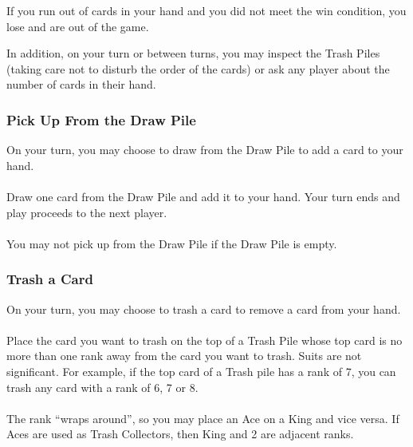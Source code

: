 \documentclass{article}
\begin{document}
If you run out of cards in your hand and you did not meet the win condition, you lose and are out of the game.

In addition, on your turn or between turns, you may inspect the Trash Piles (taking care not to disturb the order of the cards) or ask any player about the number of cards in their hand.

\subsubsection{Pick Up From the Draw Pile}
\label{sec:draw}

On your turn, you may choose to draw from the Draw Pile to add a card to your hand.

\paragraph{} \label{par:drawnormal}
Draw one card from the Draw Pile and add it to your hand. Your turn ends and play proceeds to the next player.

\paragraph{} \label{par:drawempty}
You may not pick up from the Draw Pile if the Draw Pile is empty.

\subsubsection{Trash a Card}
\label{sec:trashcard}

On your turn, you may choose to trash a card to remove a card from your hand.

\paragraph{} \label{par:trashvalid}
Place the card you want to trash on the top of a Trash Pile whose top card is no more than one rank away from the card you want to trash. Suits are not significant. For example, if the top card of a Trash pile has a rank of 7, you can trash any card with a rank of 6, 7 or 8.

\paragraph{} \label{par:trashwraparound}
The rank ``wraps around'', so you may place an Ace on a King and vice versa. If Aces are used as Trash Collectors, then King and 2 are adjacent ranks.
\end{document}
